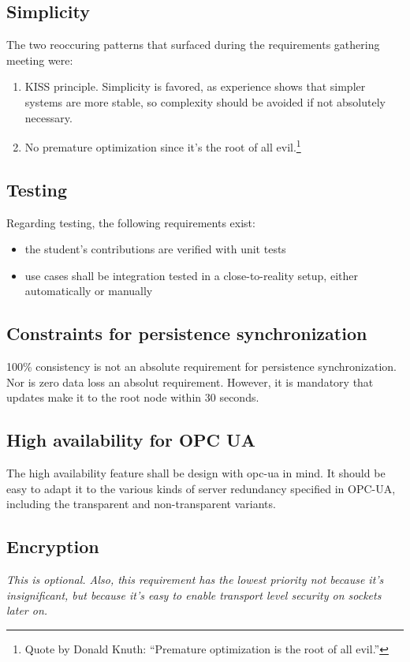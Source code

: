 \subsection{Simplicity}
The two reoccuring patterns that surfaced during the requirements gathering
meeting were:

\begin{enumerate}
\item \gls{KISS} principle. Simplicity is favored, as experience shows that
	simpler systems are more stable, so complexity should be avoided if not
	absolutely necessary.

\item No premature optimization since it's the root of all evil.\footnote{Quote
	by Donald Knuth: ``Premature optimization is the root of all evil.''}
\end{enumerate}


\subsection{Testing}
Regarding testing, the following requirements exist:
\begin{itemize}
	\item the student's contributions are verified with unit tests
	\item use cases shall be integration tested in a close-to-reality setup, either automatically or manually
\end{itemize}

\subsection{Constraints for persistence synchronization}
100\% consistency is not an absolute requirement for persistence synchronization.
Nor is zero data loss an absolut requirement. However, it is mandatory that
updates make it to the root node within 30 seconds.

\subsection{High availability for OPC UA}
The high availability feature shall be design with \gls{opc-ua} in mind. It
should be easy to adapt it to the various kinds of server redundancy specified
in OPC-UA, including the transparent and non-transparent variants.

\subsection{Encryption}
\emph{This is optional. Also, this requirement has the lowest priority not
because it's insignificant, but because it's easy to enable transport level
security on \zmq sockets later on.}

